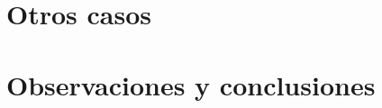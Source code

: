 \section{Otros casos}
\resetallcounters

\clearpage

\section{Observaciones y conclusiones}
\resetallcounters

\clearpage

